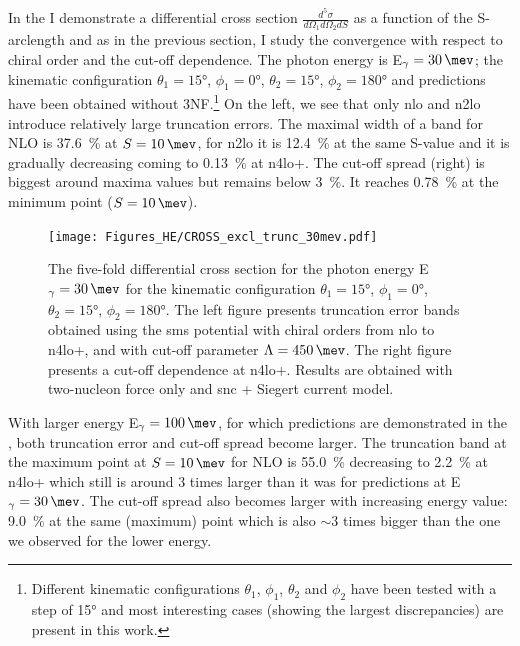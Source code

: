     In the  I demonstrate a differential cross section 
    $\frac{d^5\sigma}{d\Omega_1d\Omega_2dS}$ as a function of the S-arclength
    and as in the previous section, I study the convergence with respect to chiral
    order and the cut-off dependence.
    The photon energy is  E$_\gamma=\SI{30}{\mev}$; the kinematic configuration
    $\theta_1 = \ang{15}$, $\phi_1 = \ang{0}$,
    $\theta_2 = \ang{15}$, $\phi_2 = \ang{180}$ and predictions have been
    obtained without 3NF.\footnote{Different kinematic configurations $\theta_1$, $\phi_1$,
    $\theta_2$ and $\phi_2$ have been tested with a step of \ang{15}
    and most interesting cases (showing the largest discrepancies) are present in this work.}
    On the left, we see that only \gls{nlo} and \gls{n2lo} introduce relatively large truncation errors.
    The maximal width of a band for NLO is \SI{37.6}{\percent} at $S=\SI{10}{\mev}$,
    for \gls{n2lo} it is \SI{12.4}{\percent} at the same S-value and it is gradually decreasing
    coming to \SI{0.13}{\percent} at \gls{n4lo+}.
    The cut-off spread (right) is biggest around maxima values but remains below
    \SI{3}{\percent}. It reaches
    \SI{0.78}{\percent} at the minimum point ($S=\SI{10}{\mev}$).
    

    \begin{figure}[h]
        \begin{center}
            \texttt{[image: Figures\_HE/CROSS\_excl\_trunc\_30mev.pdf]}
            \end{center}
            \caption{The five-fold differential cross section for the photon 
            energy E$_\gamma=\SI{30}{\mev}$ for the kinematic configuration
            $\theta_1 = \ang{15}$, $\phi_1 = \ang{0}$,
            $\theta_2 = \ang{15}$, $\phi_2 = \ang{180}$.
            The left figure presents truncation error bands obtained using the \gls{sms} potential
            with chiral orders from \gls{nlo} to \gls{n4lo+}, and with
            cut-off parameter $\Lambda=\SI{450}{\mev}$.
            The right figure presents a cut-off dependence at \gls{n4lo+}.
            Results are obtained with two-nucleon force only and \gls{snc} + Siegert current
            model.}
            \label{CROSS_HE_EXCL_30}
        \end{figure}

    With larger energy E$_\gamma=\SI{100}{\mev}$, for which predictions
    are demonstrated in the ,
    both truncation error and cut-off spread become larger.
    The truncation band at the maximum point at $S=\SI{10}{\mev}$ for NLO is \SI{55.0}{\percent}
    decreasing to \SI{2.2}{\percent} at \gls{n4lo+} which still is around 3 times larger than
    it was for predictions at E$_\gamma=\SI{30}{\mev}$.
    The cut-off spread also becomes larger with increasing energy value: \SI{9.0}{\percent}
    at the same (maximum) point which is also $\sim 3$ times bigger than the one we observed
    for the lower energy.

